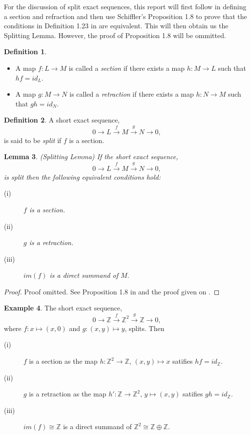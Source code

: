 \documentclass[11.5pt, twoside, a4paper, titlepage]{report}
\providecommand{\bb}[1]{\mathbb{#1}}
\theoremstyle{definition}
\newtheorem{mydef}{Definition}[section]
\newtheorem{eg}[mydef]{Example}
\theoremstyle{plain}
\newtheorem{lem}[mydef]{Lemma}
\begin{document}
For the discussion of split exact sequences, this report will first follow \cite{Schiff} in defining a section and refraction and then use Schiffler's Proposition 1.8 to prove that the conditions in Definition 1.23 in \cite{CB1} are equivalent. This will then obtain us the Splitting Lemma. However, the proof of Proposition 1.8 will be ommitted.

\begin{mydef} \label{secretdef}
\begin{itemize}
\item A map $f: L \to M$ is called a \emph{section} if there exists a map $h: M \to L$ such that $hf=id_L$.
\item A map $g:M\to N$ is called a \emph{retraction} if there exists a map $h: N \to M$ such that $gh=id_N$.
\end{itemize}
\end{mydef}

\begin{mydef}
A short exact sequence,
\begin{equation*}
0\xrightarrow{}L\xrightarrow{f} M \xrightarrow{g} N \xrightarrow{} 0,
\end{equation*}
is said to be \emph{split} if $f$ is a section.
\end{mydef}

\begin{lem} \label{splittinglem} (Splitting Lemma)
If the short exact sequence, 
\begin{equation*}
0\xrightarrow{}L\xrightarrow{f} M \xrightarrow{g} N \xrightarrow{} 0,
\end{equation*}
is split then the following equivalent conditions hold:
\begin{description}
\item [(i)] $f$ is a section.
\item [(ii)] $g$ is a retraction.
\item [(iii)] $im(f)$ is a direct summand of $M$.
\end{description}
\end{lem}
\begin{proof}
Proof omitted. See Proposition 1.8 in \cite{Schiff} and the proof given on \cite{Splittinglem}.
\end{proof}

\begin{eg}
The short exact sequence, 
\begin{equation*}
0 \xrightarrow{}\bb{Z} \xrightarrow{f} \bb{Z}^2 \xrightarrow{g} \bb{Z} \xrightarrow{} 0,
\end{equation*}
where $f: x \mapsto (x, 0)$ and $g: (x, y) \mapsto y$, splits. Then
\begin{description}
\item [(i)] $f$ is a section as the map $h:\bb{Z}^2 \to \bb{Z}$, $(x, y) \mapsto x$ satifies $hf=id_{\bb{Z}}$.
\item [(ii)] $g$ is a retraction as the map $h': \bb{Z} \to \bb{Z}^2$, $y \mapsto (x, y)$ satifies $gh=id_{\bb{Z}}$.
\item [(iii)] $im(f) \cong \bb{Z}$ is a direct summand of $\bb{Z}^2 \cong \bb{Z}\oplus \bb{Z}$.
\end{description}
\end{eg}
\end{document}
